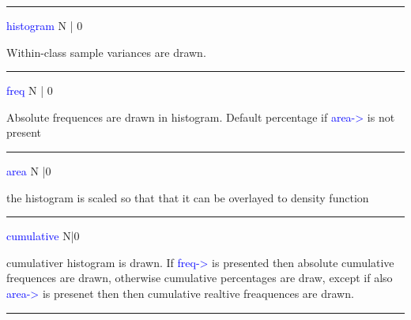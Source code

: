 \vspace{0.3cm}
\hrule
\vspace{0.3cm}
\noindent \textcolor{blue}{histogram}  \tabto{3cm}   N | 0  \tabto{5cm}     \tabto{7cm}
\begin{changemargin}{3cm}{0cm}
\noindent Within-class sample variances are drawn.
\end{changemargin}
\vspace{0.3cm}
\hrule
\vspace{0.3cm}
\noindent \textcolor{blue}{freq}  \tabto{3cm}  N | 0  \tabto{5cm}     \tabto{7cm}
\begin{changemargin}{3cm}{0cm}
\noindent  Absolute  frequences are drawn in histogram. Default
percentage if \textcolor{blue}{area->} is not present
\end{changemargin}
\vspace{0.3cm}
\hrule
\vspace{0.3cm}
\noindent \textcolor{blue}{area}  \tabto{3cm}  N |0  \tabto{5cm}    \tabto{7cm}
\begin{changemargin}{3cm}{0cm}
\noindent the histogram is scaled so that that it can be overlayed to density function
\end{changemargin}
\vspace{0.3cm}
\hrule
\vspace{0.3cm}
\noindent \textcolor{blue}{cumulative}  \tabto{3cm} N|0  \tabto{5cm}    \tabto{7cm}
\begin{changemargin}{3cm}{0cm}
\noindent  cumulativer histogram is drawn. If \textcolor{blue}{freq->} is presented then absolute
cumulative frequences are drawn, otherwise cumulative percentages are draw, except if also \textcolor{blue}{area->}
is presenet then then cumulative realtive freaquences are drawn.
\end {changemargin}
\hrule
\vspace{0.2cm}
